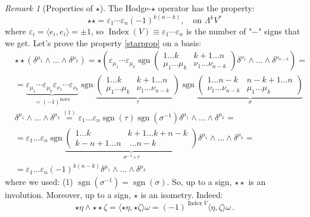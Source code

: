 \documentclass[a4paper,11pt,titlepage, article, oneside]{memoir}
\numberwithin{equation}{section}
\theoremstyle{definition}
\theoremstyle{remark}
\newtheorem{remark}[theorem]{Remark}
\DeclareMathOperator{\Index}{Index}
\DeclareMathOperator{\sgn}{sgn}
\begin{document}
\begin{remarkbox}\begin{remark}[Properties of $\star$]
The Hodge-$\star$ operator has the property:
\begin{equation} \label{starprop}
\star \star = \varepsilon_1 \cdots \varepsilon_n (-1)^{k(n-k)}, \quad \text{on } \Lambda^k V^*
\end{equation}
where $\varepsilon_i = \langle e_i, e_i \rangle = \pm 1$, so $\Index(V) \equiv \varepsilon_1 \cdots \varepsilon_n$ is the number of "$-$" signs that we get. Let's prove the property \eqref{starprop} on a basis:
\begin{align*}
& \star \star (\delta^{\mu_1} \wedge \ldots \wedge \delta^{\mu_k}) = \star \left ( \varepsilon_{\mu_1} \cdots \varepsilon_{\mu_k} \sgn \left(
\begin{matrix}
1\ldots k &k+1\ldots n \\
\mu_1\ldots \mu_k & \nu_1 \ldots \nu_{n-k}
\end{matrix}
\right)  \delta^{\nu_1} \wedge \ldots \wedge \delta^{\nu_{n-k}}\right) = \\
&= \underbrace{\varepsilon_{\mu_1} \cdots \varepsilon_{\mu_k} \varepsilon_{\nu_1} \cdots \varepsilon_{\nu_k}}_{=(-1)^{\Index}} \sgn \underbrace{ \left(
\begin{matrix}
1\ldots k &k+1\ldots n \\
\mu_1\ldots \mu_k & \nu_1 \ldots \nu_{n-k}
\end{matrix}
\right)}_{\tau} \sgn \underbrace{ \left(
\begin{matrix}
1\ldots n-k &n-k+1\ldots n \\
\nu_1 \ldots \nu_{n-k}& \mu_1 \ldots \mu_{k}
\end{matrix}
\right)}_{\sigma} \\
& \delta^{\mu_1} \wedge \ldots \wedge \delta^{\mu_k} \overset{(1)}{=}  \varepsilon_1 \ldots \varepsilon_n \sgn (\tau) \sgn(\sigma^{-1}) \delta^{\mu_1} \wedge \ldots \wedge \delta^{\mu_k} = \\
&=  \varepsilon_1 \ldots \varepsilon_n \sgn \underbrace{ \left (
\begin{matrix}
1 \ldots k & k+1 \ldots k+n-k \\
k -n+1 \ldots n & \ \ldots n-k
\end{matrix} \right)
}_{\sigma^{-1} \circ \tau} \delta^{\mu_1} \wedge \ldots \wedge \delta^{\mu_k}  = \\
&= \varepsilon_1 \ldots \varepsilon_n (-1)^{k(n-k)} \delta^{\mu_1} \wedge \ldots \wedge \delta^{\mu_k}
\end{align*}
where we used: (1) $\sgn(\sigma^{-1}) = \sgn(\sigma)$. So, up to a sign, $\star \star$ is an involution. Moreover, up to a sign, $\star$ is an isometry. Indeed:
$$\star \eta \wedge \star \star \zeta = \langle \star \eta , \star \zeta \rangle \omega = (-1)^{\Index V} \langle \eta, \zeta \rangle \omega \, .$$
\end{remark}\end{remarkbox}
\end{document}
